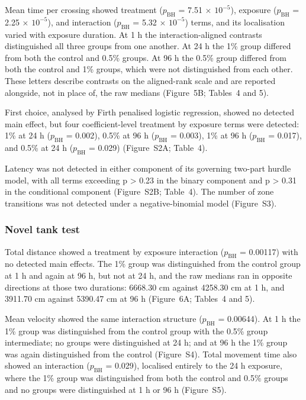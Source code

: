 \documentclass[12pt,a4paper]{article}
\begin{document}
Mean time per crossing showed treatment ($p_{\mathrm{BH}}$ = 7.51 $\times$ $10^{-5}$), exposure ($p_{\mathrm{BH}}$ = 2.25 $\times$ $10^{-5}$), and interaction ($p_{\mathrm{BH}}$ = 5.32 $\times$ $10^{-5}$) terms, and its localisation varied with exposure duration. At 1 h the interaction-aligned contrasts distinguished all three groups from one another. At 24 h the 1\% group differed from both the control and 0.5\% groups. At 96 h the 0.5\% group differed from both the control and 1\% groups, which were not distinguished from each other. These letters describe contrasts on the aligned-rank scale and are reported alongside, not in place of, the raw medians (Figure~5B; Tables~4 and 5).

First choice, analysed by Firth penalised logistic regression, showed no detected main effect, but four coefficient-level treatment by exposure terms were detected: 1\% at 24 h ($p_{\mathrm{BH}}$ = 0.002), 0.5\% at 96 h ($p_{\mathrm{BH}}$ = 0.003), 1\% at 96 h ($p_{\mathrm{BH}}$ = 0.017), and 0.5\% at 24 h ($p_{\mathrm{BH}}$ = 0.029) (Figure~S2A; Table~4).

Latency was not detected in either component of its governing two-part hurdle model, with all terms exceeding p > 0.23 in the binary component and p > 0.31 in the conditional component (Figure~S2B; Table~4). The number of zone transitions was not detected under a negative-binomial model (Figure~S3).

\subsubsection{Novel tank test}
\label{sec-3-4-3}

Total distance showed a treatment by exposure interaction ($p_{\mathrm{BH}}$ = 0.00117) with no detected main effects. The 1\% group was distinguished from the control group at 1 h and again at 96 h, but not at 24 h, and the raw medians ran in opposite directions at those two durations: 6668.30 cm against 4258.30 cm at 1 h, and 3911.70 cm against 5390.47 cm at 96 h (Figure~6A; Tables~4 and 5).

Mean velocity showed the same interaction structure ($p_{\mathrm{BH}}$ = 0.00644). At 1 h the 1\% group was distinguished from the control group with the 0.5\% group intermediate; no groups were distinguished at 24 h; and at 96 h the 1\% group was again distinguished from the control (Figure~S4). Total movement time also showed an interaction ($p_{\mathrm{BH}}$ = 0.029), localised entirely to the 24 h exposure, where the 1\% group was distinguished from both the control and 0.5\% groups and no groups were distinguished at 1 h or 96 h (Figure~S5).
\end{document}
